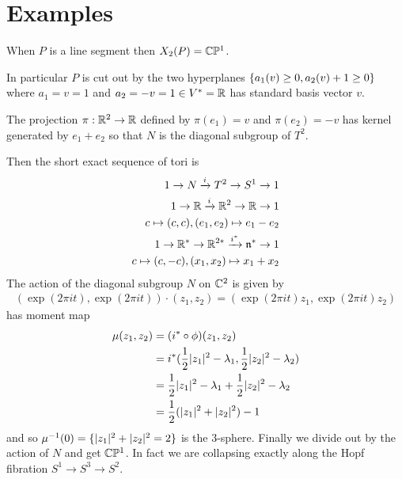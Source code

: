\documentclass[12pt]{article}
\begin{document}
\section{Examples}
\begin{example}
	When $P$ is a line segment then $X_2(P) = \mathbb{C}\mathbb{P}^1$.

	\hfill

	In particular $P$ is cut out by the two hyperplanes $\{a_1(v) \geq 0,a_2(v) + 1\geq 0\}$
	where $a_1 = v = 1$ and $a_2 = -v = 1 \in V^* = \mathbb{R}$ has standard basis vector $v$.

	\hfill

	The projection $\pi:\mathbb{R}^2\to \mathbb{R}$ defined by $\pi(e_1) = v$ and $\pi(e_2) = -v$
	has kernel generated by $e_1 + e_2$ so that $N$ is the diagonal subgroup of $T^2$.

	Then the short exact sequence of tori is \begin{align*}
		1 \to N \xrightarrow{i} T^2 \to S^1 \to 1               \\
		1 \to \mathbb{R} \xrightarrow{i} \mathbb{R}^2 \to \mathbb{R} \to 1              \\
		c\mapsto (c,c), (e_1,e_2)\mapsto e_1-e_2                \\
		1 \to \mathbb{R}^* \to \mathbb{R}^{2*} \xrightarrow{i^*} \mathfrak{n}^* \to 1 \\
		c\mapsto (c,-c), (x_1,x_2)\mapsto x_1+x_2
	\end{align*} The action of the diagonal subgroup $N$ on $\mathbb{C}^2$ is given by \begin{align*}
		(\exp(2\pi it),\exp(2\pi it))\cdot (z_1,z_2) = (\exp(2\pi it)z_1,\exp(2\pi it)z_2)
	\end{align*} has moment map \begin{align*}
		\mu(z_1,z_2) & = (i^*\circ \phi)(z_1,z_2)                                 \\
		             & = i^*(\frac{1}{2} |z_1|^2 - \lambda_1,\frac{1}{2} |z_2|^2 - \lambda_2) \\
		             & = \frac{1}{2} |z_1|^2 - \lambda_1 + \frac{1}{2} |z_2|^2 - \lambda_2    \\
		             & = \frac{1}{2} (|z_1|^2 + |z_2|^2) - 1
	\end{align*} and so $\mu^{-1}(0) = \{|z_1|^2 + |z_2|^2 = 2\}$ is the 3-sphere. Finally
	we divide out by the action of $N$ and get $\mathbb{C}\mathbb{P}^1$. In fact we are collapsing exactly along the Hopf
	fibration $S^1\to S^3\to S^2$.
\end{example}
\end{document}
